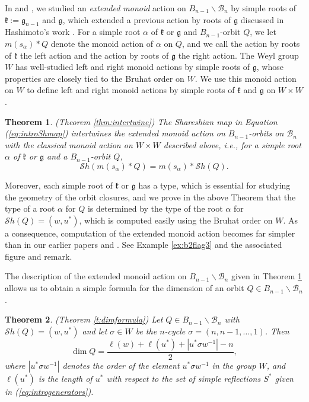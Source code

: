 \documentclass[12pt]{amsart}
\numberwithin{equation}{section}
\newtheorem{thm}{Theorem}[section]
\newcommand{\fk}{\mbox{${\mathfrak k}$}}
\newcommand{\fg}{\mbox{${\mathfrak g}$}}
\newcommand{\B}{\mathcal{B}}
\newcommand{\ms}{m(s_{\alpha})}
\newcommand{\Borbitspace}{B_{n-1}\backslash\B_{n}}
\newcommand{\Sh}{\mathcal{S}h}
\begin{document}
 In \cite{CE21I} and \cite{CE21II}, we studied an \emph{extended monoid} action on $\Borbitspace$ by simple roots of $\fk:=\fg_{n-1}$ and $\fg$, which extended a previous action by roots of $\fg$ discussed in Hashimoto's work \cite{Hashi}. 
For a simple root $\alpha$ of $\fk$ or $\fg$ and $B_{n-1}$-orbit $Q$, we let 
$\ms*Q$ denote the monoid action of $\alpha$ on $Q$, and we call the action by roots of $\fk$ the left action and the action by roots of $\fg$ the right action.
  The Weyl group $W$ has well-studied left and right monoid actions by simple roots of $\fg$, whose properties are closely tied to the Bruhat order on $W$.  We use this monoid action on $W$ to define left and right monoid actions by simple roots of $\fk$ and $\fg$ on $W\times W$.
\begin{thm}\label{thm:intromonoid}(Theorem \ref{thm:intertwine})
 The Shareshian map in Equation (\ref{eq:introShmap}) intertwines the extended monoid action on $B_{n-1}$-orbits on $\B_{n}$ with the classical monoid action on $W\times W$ described above, i.e., for a simple root $\alpha$ of $\fk$ or $\fg$ and a $B_{n-1}$-orbit $Q$, 
 \begin{equation}\label{eq:intromonoids}
 \Sh(\ms*Q)=\ms*\Sh(Q).
 \end{equation}
 \end{thm}
\noindent Moreover, each simple root of $\fk$ or $\fg$ has a type, which is essential for studying the geometry of the orbit closures, and we prove in the above Theorem that the type of a root $\alpha$ for $Q$ is determined by the type of the root $\alpha$ for $\Sh(Q)=(w,u^{*})$, which is computed easily using the Bruhat order on $W$.   As a consequence, computation of the extended monoid action becomes far simpler than in our earlier papers \cite{CE21I} and \cite{CE21II}.  
 See Example \ref{ex:b2flag3} and the associated figure and remark.   

The description of the extended monoid action on $\Borbitspace$ given in Theorem \ref{thm:intromonoid} allows us to obtain a simple formula for the dimension of an orbit $Q\in\Borbitspace$. 
\begin{thm}\label{thm:introdim}(Theorem \ref{t:dimformula})
Let $Q\in\Borbitspace$ with $\Sh(Q)=(w, u^{*})$ and let $\sigma\in W$ be the $n$-cycle 
$\sigma=(n,n-1, \dots, 1)$.  Then 
$$
\dim Q=\frac{\ell(w)+\ell(u^{*})+|u^{*}\sigma w^{-1}|-n}{2},
$$
where $|u^{*}\sigma w^{-1}|$ denotes the order of the element $u^{*}\sigma w^{-1}$ in the group $W$, and $\ell(u^{*})$ is the length of $u^{*}$ with respect to the set of simple reflections $S^{*}$ given in (\ref{eq:introgenerators}).  
\end{thm}
\end{document}
